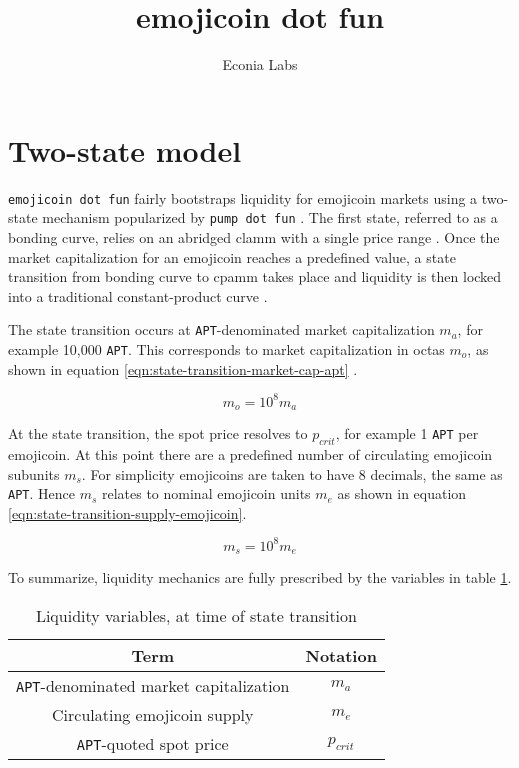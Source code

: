 \documentclass[table, twocolumn]{article}
\title{emojicoin dot fun}
\author{Econia Labs}
\date{}
\begin{document}
\maketitle

\section{Two-state model}

\texttt{emojicoin dot fun} fairly bootstraps liquidity for emojicoin markets using a
two-state mechanism popularized by \texttt{pump dot fun} \cite{pump}. The first state,
referred to as a bonding curve, relies on an abridged \gls*{clamm} with a single price
range \cite{univ3}. Once the market capitalization for an emojicoin reaches a
predefined value, a state transition from bonding curve to \gls*{cpamm} takes place and
liquidity is then locked into a traditional constant-product curve \cite{univ2}.

The state transition occurs at \texttt{APT}-denominated market capitalization $m_a$, for
example 10,000 \texttt{APT}. This corresponds to market capitalization in octas $m_o$,
as shown in equation \ref{eqn:state-transition-market-cap-apt} \cite{octas}.

\begin{equation} \label{eqn:state-transition-market-cap-apt}
  m_o = 10^8 m_a
\end{equation}

At the state transition, the spot price resolves to $p_{crit}$, for example 1
\texttt{APT} per emojicoin. At this point there are a predefined number of circulating
emojicoin subunits $m_s$. For simplicity emojicoins are taken to have 8 decimals, the
same as \texttt{APT}. Hence $m_s$ relates to nominal emojicoin units $m_e$ as shown
in equation \ref{eqn:state-transition-supply-emojicoin}.

\begin{equation} \label{eqn:state-transition-supply-emojicoin}
  m_s = 10^8 m_e
\end{equation}

To summarize, liquidity mechanics are fully prescribed by the variables in table
\ref{tab:state-model-variables}.

\begin{table}[!htb]
  \centering
  \begin{tabular}{|c|c|}
    \hline \rowcolor{blue}
    Term                                           & Notation   \\ \hline
    \texttt{APT}-denominated market capitalization & $m_a$      \\ \hline
    Circulating emojicoin supply                   & $m_e$      \\ \hline
    \texttt{APT}-quoted spot price                 & $p_{crit}$ \\ \hline
  \end{tabular}
  \caption{Liquidity variables, at time of state transition}
  \label{tab:state-model-variables}
\end{table}
\end{document}

